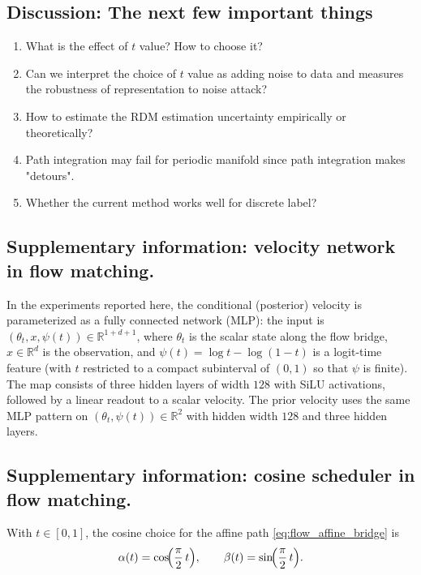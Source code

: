 \pagebreak

\subsection{Discussion: The next few important things}

\begin{enumerate}
  \item What is the effect of $t$ value? How to choose it?
  \item Can we interpret the choice of $t$ value as adding noise to data and measures the robustness of representation to noise attack?
  \item How to estimate the RDM estimation uncertainty empirically or theoretically?
  \item Path integration may fail for periodic manifold since path integration makes "detours".
  \item Whether the current method works well for discrete label?
\end{enumerate}

\subsection{Supplementary information: velocity network in flow matching.}
In the experiments reported here, the conditional (posterior) velocity is parameterized as a fully connected network (MLP): the input is $(\theta_t, x, \psi(t)) \in \mathbb{R}^{1 + d + 1}$, where $\theta_t$ is the scalar state along the flow bridge, $x \in \mathbb{R}^{d}$ is the observation, and $\psi(t)=\log t - \log(1-t)$ is a logit-time feature (with $t$ restricted to a compact subinterval of $(0,1)$ so that $\psi$ is finite).
The map consists of three hidden layers of width $128$ with SiLU activations, followed by a linear readout to a scalar velocity.
The prior velocity uses the same MLP pattern on $(\theta_t, \psi(t)) \in \mathbb{R}^{2}$ with hidden width $128$ and three hidden layers.

\subsection{Supplementary information: cosine scheduler in flow matching.}
With $t \in [0,1]$, the cosine choice for the affine path \eqref{eq:flow_affine_bridge} is
\begin{equation}
  \alpha(t) = \cos\!\Bigl(\frac{\pi}{2}\,t\Bigr),
  \qquad
  \beta(t) = \sin\!\Bigl(\frac{\pi}{2}\,t\Bigr).
\end{equation}

